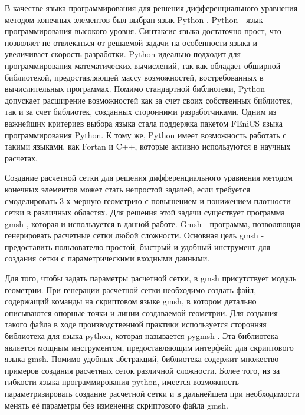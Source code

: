 В качестве языка программирования для решения дифференциального уравнения методом конечных элементов был выбран язык 
Python \cite{python_lutz}. Python - язык программирования высокого уровня. Синтаксис языка достаточно прост, что 
позволяет не отвлекаться от решаемой задачи на особенности языка и увеличивает скорость разработки. Python идеально 
подходит для программирования математических вычислений, так как обладает обширной библиотекой, предоставляющей массу 
возможностей, востребованных в вычислительных программах. Помимо стандартной библиотеки, Python допускает расширение 
возможностей как за счет своих собственных библиотек, так и за счет библиотек, созданных сторонними разработчиками. 
Одним из важнейших критериев выбора языка стала поддержка пакетом FEniCS языка программирования Python. К тому же, 
Python имеет возможность работать с такими языками, как Fortan и C++, которые активно используются в научных расчетах.

Создание расчетной сетки для решения дифференциального уравнения методом конечных элементов может стать непростой 
задачей, если требуется смоделировать 3-х мерную геометрию с повышением и понижением плотности сетки в различных 
областях. Для решения этой задачи существует программа gmsh \cite{gmsh_man}, которая и используется в данной работе.
Gmsh - программа, позволяющая генерировать расчетные сетки любой сложности. Основная цель gmsh - предоставить 
пользователю простой, быстрый и удобный инструмент для создания сетки с параметрическими входными данными.

Для того, чтобы задать параметры расчетной сетки, в gmsh присутствует модуль геометрии. При генерации расчетной сетки 
необходимо создать файл, содержащий команды на скриптовом языке gmsh, в котором детально описываются опорные точки и 
линии создаваемой геометрии. Для создания такого файла в ходе производственной практики используется сторонняя 
библиотека для языка python, которая называется pygmsh \cite{pygmsh_doc}. Эта библиотека является мощным инструментом, 
предоставляющим интерфейс для скриптового языка gmsh. Помимо удобных абстракций, библиотека содержит множество 
примеров создания расчетных сеток различной сложности. Более того, из за гибкости языка программирования python, 
имеется возможность параметризировать создание расчетной сетки и в дальнейшем при необходимости менять её параметры 
без изменения скриптового файла gmsh.
